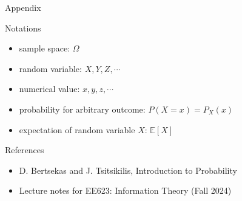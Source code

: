 \documentclass[9pt]{beamer}
\begin{document}
    \begin{frame}{Appendix}
      \begin{block}{Notations}
        \begin{itemize}
          \item sample space: $\Omega$
          \item random variable: $X, Y, Z, \cdots$
          \item numerical value: $x, y, z, \cdots$
          \item probability for arbitrary outcome: $P(X=x)  = P_X(x)$
          \item expectation of random variable $X$: $\mathbb E[X]$
        \end{itemize}
      \end{block}
    \end{frame}

    \begin{frame}{References}
      \begin{itemize}
        \item D. Bertsekas and J. Tsitsikilis, Introduction to Probability
        \item Lecture notes for EE623: Information Theory (Fall 2024)
    \end{itemize}
    \vspace{6cm}
    \end{frame}
\end{document}
